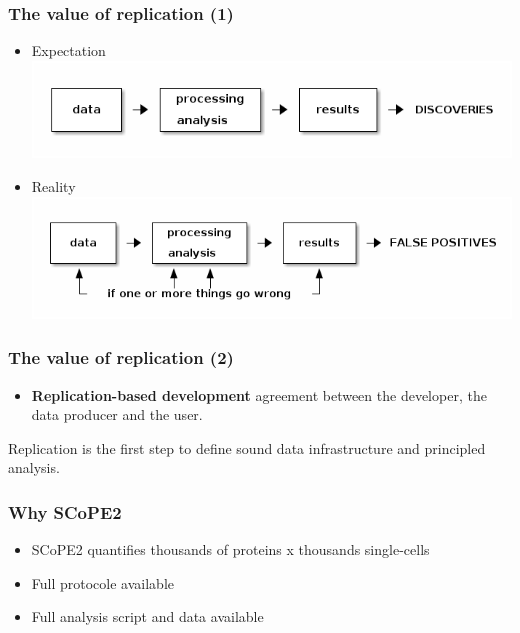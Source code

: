 \documentclass{beamer}
\newcommand{\frametitlesection}[1]{\frametitle{\centering #1 \footnotesize \hspace{0pt plus 1 filll} \insertsection}}
\begin{document}
\begin{frame}
  \frametitlesection{The value of replication (1)}

  \begin{itemize}
  \item<+-> Expectation
    \includegraphics[width=\linewidth]{figs/expectation.png}
  \item<+-> Reality
    \includegraphics[width=\linewidth]{figs/reality.png}
  \end{itemize}
  
\end{frame}

\begin{frame}
  \frametitlesection{The value of replication (2)}

  \begin{itemize}
  \item \textbf{Replication-based development} agreement between the
    developer, the data producer and the user.
  \end{itemize}


  \bigskip
  
  Replication is the first step to define sound data infrastructure
  and principled analysis.
  
\end{frame}

\begin{frame}
  \frametitlesection{Why SCoPE2}
    \begin{itemize}
        \item{SCoPE2 quantifies thousands of proteins x thousands single-cells}
        \item{Full protocole available}
        \item{Full analysis script and data available}
    \end{itemize}


\end{frame}
\end{document}
